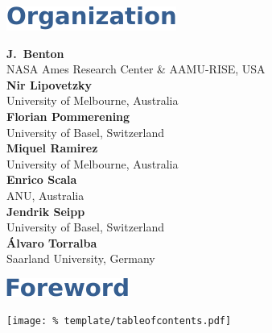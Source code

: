 \documentclass[letterpaper]{article}
\begin{document}

\cleardoublepage

\vspace*{5mm}
\includegraphics[trim={15pt 0pt 0pt 0pt}]{template/organization.pdf}

\vspace*{14mm}
\noindent\textbf{J.\ Benton}\\
NASA Ames Research Center \& AAMU-RISE, USA\\[1em]
\textbf{Nir Lipovetzky}\\
University of Melbourne, Australia\\[1em]
\textbf{Florian Pommerening}\\
University of Basel, Switzerland\\[1em]
\textbf{Miquel Ramirez}\\
University of Melbourne, Australia\\[1em]
\textbf{Enrico Scala}\\
ANU, Australia\\[1em]
\textbf{Jendrik Seipp}\\
University of Basel, Switzerland\\[1em]
\textbf{\'{A}lvaro Torralba}\\
Saarland University, Germany

\clearpage

\vspace*{5mm}
\includegraphics[trim={15pt 0pt 0pt 0pt}]{template/preface.pdf}


\clearpage

\vspace*{5mm}
\texttt{[image: \%
 template/tableofcontents.pdf]}

\renewcommand\contentsname{}
\tableofcontents

\cleardoublepage
{}

\end{document}
